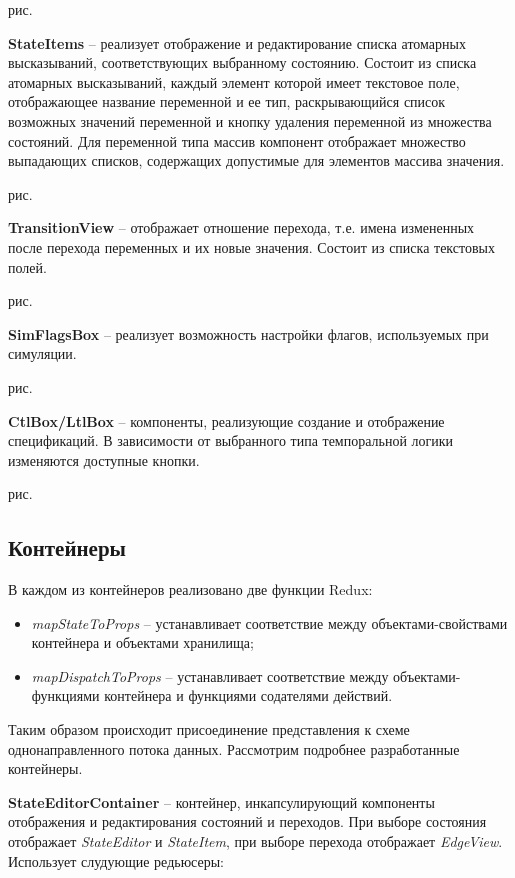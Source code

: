 рис.

\textbf{StateItems} -- реализует отображение и редактирование списка атомарных высказываний, соответствующих выбранному состоянию. Состоит из списка атомарных высказываний, каждый элемент которой имеет текстовое поле, отображающее название переменной и ее тип, раскрывающийся список возможных значений переменной и кнопку удаления переменной из множества состояний. Для переменной типа массив компонент отображает множество выпадающих списков, содержащих допустимые для элементов массива значения.

рис.

\textbf{TransitionView} -- отображает отношение перехода, т.е. имена измененных после перехода переменных и их новые значения. Состоит из списка текстовых полей.

рис.

\textbf{SimFlagsBox} -- реализует возможность настройки флагов, используемых при симуляции.

рис.

\textbf{CtlBox/LtlBox} -- компоненты, реализующие создание и отображение спецификаций. В зависимости от выбранного типа темпоральной логики изменяются доступные кнопки.

рис.

\subsection{Контейнеры}

В каждом из контейнеров реализовано две функции Redux: 

\begin{itemize}
	\item \textit{mapStateToProps} -- устанавливает соответствие между объектами-свойствами контейнера и объектами хранилища;
	\item \textit{mapDispatchToProps} -- устанавливает соответствие между объектами-функциями контейнера и функциями содателями действий.
\end{itemize}

Таким образом происходит присоединение представления к схеме однонаправленного потока данных. Рассмотрим подробнее разработанные контейнеры.

\textbf{StateEditorContainer} -- контейнер, инкапсулирующий компоненты отображения и редактирования состояний и переходов. При выборе состояния отображает \textit{StateEditor} и \textit{StateItem}, при выборе перехода отображает \textit{EdgeView}. Использует слудующие редьюсеры:

